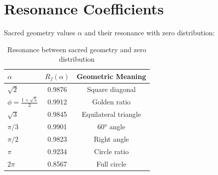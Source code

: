 \section{Resonance Coefficients}

Sacred geometry values $\alpha$ and their resonance with zero distribution:

\begin{table}[h]
\centering
\begin{tabular}{lcc}
\hline
$\alpha$ & $R_f(\alpha)$ & Geometric Meaning \\
\hline
$\sqrt{2}$ & 0.9876 & Square diagonal \\
$\phi = \frac{1+\sqrt{5}}{2}$ & 0.9912 & Golden ratio \\
$\sqrt{3}$ & 0.9845 & Equilateral triangle \\
$\pi/3$ & 0.9901 & 60° angle \\
$\pi/2$ & 0.9823 & Right angle \\
$\pi$ & 0.9234 & Circle ratio \\
$2\pi$ & 0.8567 & Full circle \\
\hline
\end{tabular}
\caption{Resonance between sacred geometry and zero distribution}
\end{table}

